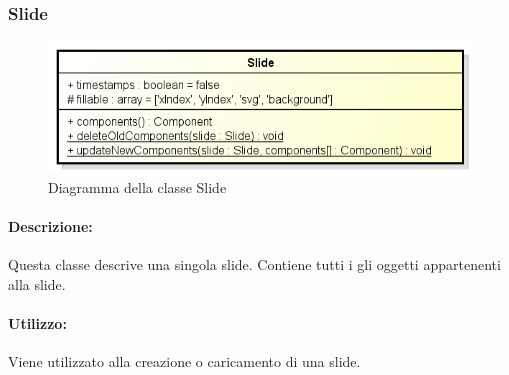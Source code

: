 \subsubsection{Slide}

	\begin{figure}[h]
		\centering
		\includegraphics[width=0.7\linewidth]{img/back_end_premi_model_slide}
		\caption[Diagramma della classe \gls{Slide}]{Diagramma della classe Slide}
		\label{fig:back_end_premi_model_slide}
	\end{figure}


	\paragraph{Descrizione:}
	Questa classe descrive una singola \gls{slide}. Contiene tutti i gli oggetti appartenenti alla \gls{slide}.
	
	\paragraph{Utilizzo:}
	Viene utilizzato alla creazione o caricamento di una \gls{slide}.

